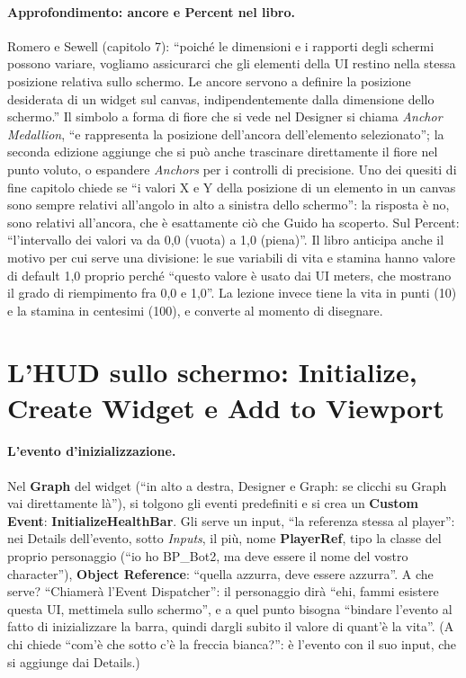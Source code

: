 \paragraph{Approfondimento: ancore e Percent nel libro.} Romero e Sewell (capitolo 7):
``poiché le dimensioni e i rapporti degli schermi possono variare, vogliamo assicurarci
che gli elementi della UI restino nella stessa posizione relativa sullo schermo. Le ancore
servono a definire la posizione desiderata di un widget sul canvas, indipendentemente
dalla dimensione dello schermo.'' Il simbolo a forma di fiore che si vede nel Designer si
chiama \emph{Anchor Medallion}, ``e rappresenta la posizione dell'ancora dell'elemento
selezionato''; la seconda edizione aggiunge che si può anche trascinare direttamente il
fiore nel punto voluto, o espandere \emph{Anchors} per i controlli di precisione. Uno dei
quesiti di fine capitolo chiede se ``i valori X e Y della posizione di un elemento in un
canvas sono sempre relativi all'angolo in alto a sinistra dello schermo'': la risposta è
no, sono relativi all'ancora, che è esattamente ciò che Guido ha scoperto. Sul Percent:
``l'intervallo dei valori va da 0,0 (vuota) a 1,0 (piena)''. Il libro anticipa anche il
motivo per cui serve una divisione: le sue variabili di vita e stamina hanno valore di
default 1,0 proprio perché ``questo valore è usato dai UI meters, che mostrano il grado di
riempimento fra 0,0 e 1,0''. La lezione invece tiene la vita in punti (10) e la stamina in
centesimi (100), e converte al momento di disegnare.

\section{L'HUD sullo schermo: Initialize, Create Widget e Add to Viewport}
\label{ue11:sec:viewport}

\paragraph{L'evento d'inizializzazione.} Nel \textbf{Graph} del widget (``in alto a
destra, Designer e Graph: se clicchi su Graph vai direttamente là''), si tolgono gli eventi
predefiniti e si crea un \textbf{Custom Event}: \textbf{InitializeHealthBar}. Gli serve un
input, ``la referenza stessa al player'': nei Details dell'evento, sotto \emph{Inputs}, il
più, nome \textbf{PlayerRef}, tipo la classe del proprio personaggio (``io ho BP\_Bot2,
ma deve essere il nome del vostro character''), \textbf{Object Reference}: ``quella
azzurra, deve essere azzurra''. A che serve? ``Chiamerà l'Event Dispatcher'': il personaggio
dirà ``ehi, fammi esistere questa UI, mettimela sullo schermo'', e a quel punto bisogna
``bindare l'evento al fatto di inizializzare la barra, quindi dargli subito il valore di
quant'è la vita''. (A chi chiede ``com'è che sotto c'è la freccia bianca?'': è l'evento con
il suo input, che si aggiunge dai Details.)

